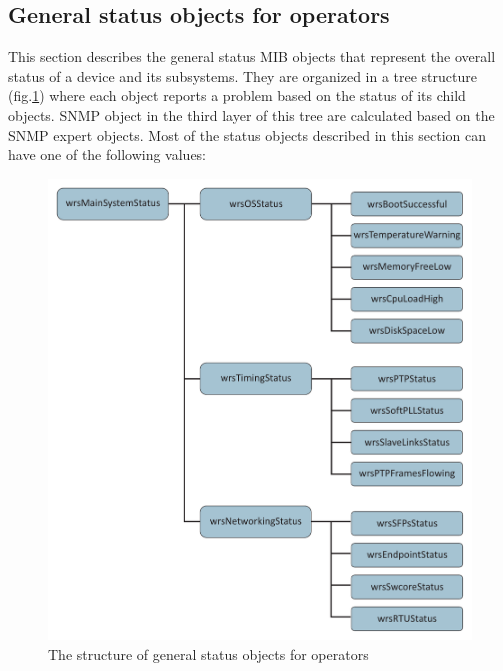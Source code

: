 \subsection{General status objects for operators}
\label{sec:snmp_exports:basic}
This section describes the general status MIB objects that represent the overall
status of a device and its subsystems. They are organized in a tree structure
(fig.\ref{fig:snmp_oper}) where each object reports a problem based on the
status of its child objects. SNMP object in the third layer of this tree are
calculated based on the SNMP expert objects. Most of the status objects
described in this section can have one of the following values:
\begin{figure}[ht]
  \begin{center}
    \includegraphics[width=.8\textwidth]{img/snmp_obj.pdf}
    \caption{The structure of general status objects for operators}
    \label{fig:snmp_oper}
  \end{center}
\end{figure}
